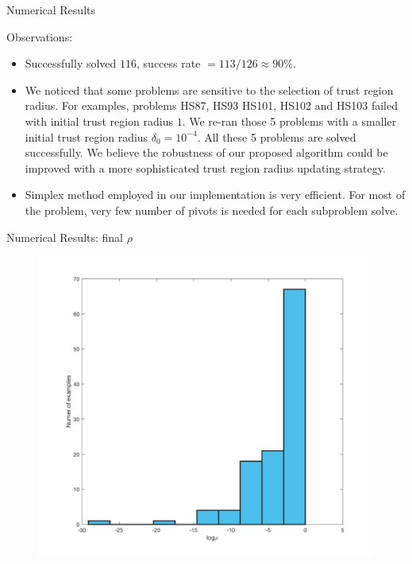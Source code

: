 \documentclass[8pt]{beamer}
\begin{document}
\begin{frame}{Numerical Results}


Observations: 
\vfill
\begin{itemize}
\item  
Successfully solved $116$, success rate   $  = 113/126 \approx 90 \%$. 
\vfill
\item   
We noticed that some problems
 are sensitive to the selection of trust region radius. For examples, problems HS87, HS93 HS101, HS102 and HS103 failed with initial trust region radius $1$. We re-ran those 5 problems with a smaller initial trust region radius $\delta_{0} = 10^{-4}$. All these 5 problems are solved successfully. We believe the robustness of our proposed algorithm could be improved with a more sophisticated trust region radius updating strategy. 
 \item Simplex method employed in our implementation is very efficient. For most of the problem, very few number of pivots is needed for each subproblem solve. 
\end{itemize}



\end{frame}

 

\begin{frame}[c]{Numerical Results:  final $\rho$   }

\begin{figure}[H]
\includegraphics[scale=0.15]{pic/rho}
\end{figure}

\end{frame}
\end{document}
